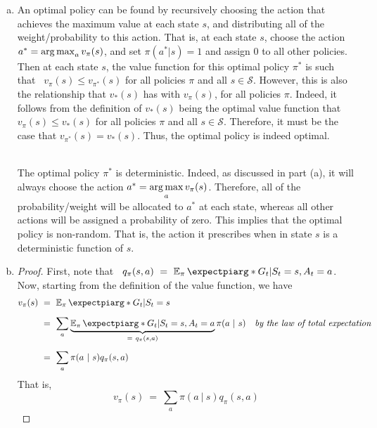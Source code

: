 \documentclass[twoside,11pt]{homework}
\DeclarePairedDelimiter{\2norm}{\lVert}{\rVert^2_2}
\newcommand{\1}[1]{\mathds{1}\left[#1\right]}
\newcommand{\expectpi}{\operatorname{\mathbb{E}_{\pi}}\expectpiarg}
\begin{document}
\begin{enumerate}[(a)]
\item 
An optimal policy can be found by recursively choosing the action that achieves the maximum value at each state $s$, and distributing all of the weight/probability to this action. That is, at each state $s$, choose the action $a^* = \operatorname*{arg\,max}_{a} v_{\pi}(s)$, and set $\pi(a^*|s) = 1$ and assign $0$ to all other policies. Then at each state $s$, the value function for this optimal policy $\pi^*$ is such that \ $v_{\pi}(s) \leq v_{\pi^*}(s)$ for all policies $\pi$ and all $s \in \mathcal{S}$. However, this is also the relationship that $v_*(s)$ has with $v_{\pi}(s)$, for all policies $\pi$. Indeed, it follows from the definition of $v_*(s)$ being the optimal value function that $v_{\pi}(s) \leq v_{*}(s)$ for all policies $\pi$ and all $s \in \mathcal{S}$. Therefore, it must be the case that $v_{\pi^*}(s) = v_*(s)$. Thus, the optimal policy is indeed optimal.\\\

The optimal policy $\pi^*$ is deterministic. Indeed, as discussed in part (a), it will always choose the action $a^* = \mathlarger{\argmax_{a} v_{\pi}(s)}$. Therefore, all of the probability/weight will be allocated to $a^*$ at each state, whereas all other actions will be assigned a probability of zero. This implies that the optimal policy is non-random. That is, the action it prescribes when in state $s$ is a deterministic function of $s$.

\item \begin{proof}
First, note that \ $q_{\pi}(s, a)  \ = \ \expectpi*{G_t | S_t = s , A_t = a}$. Now, starting from the definition of the value function, we have
\begin{align*}
v_{\pi}(s) \ & = \ \expectpi*{G_t | S_t = s} \\[0.5em]
& = \ \sum_{a} \underbrace{\expectpi*{  G_t   |   S_t = s, A_t = a }}_{= \ q_{\pi}(s,a)}\pi(a \ | \ s) & \textit{by the law of total expectation}\\[0.5em]
& = \ \sum_{a} \pi(a \ | \ s)q_{\pi}(s,a)
\end{align*}
That is, $$v_{\pi}(s) \ = \ \sum_{a} \pi(a \ | \ s)q_{\pi}(s,a)$$


\end{proof}
\end{enumerate}
\end{document}
